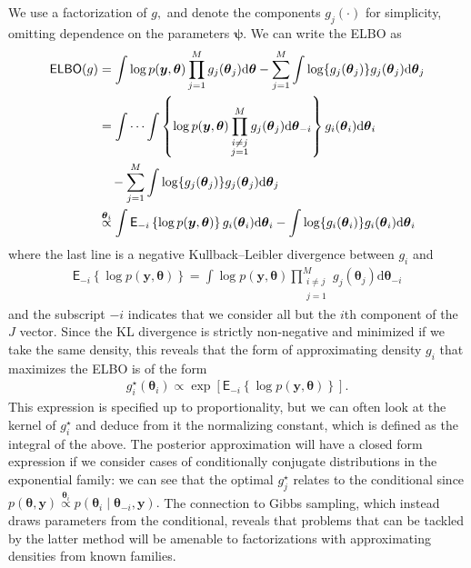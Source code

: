 \documentclass[
  11pt,
  letterpaper,
]{scrbook}
\theoremstyle{plain}
\theoremstyle{definition}
\theoremstyle{definition}
\theoremstyle{plain}
\theoremstyle{plain}
\theoremstyle{definition}
\theoremstyle{remark}
\begin{document}
We use a factorization of \(g,\) and denote the components
\(g_j(\cdot)\) for simplicity, omitting dependence on the parameters
\(\boldsymbol{\psi}.\) We can write the ELBO as \begin{align*}
\mathsf{ELBO}(g) &= \int \log p(\boldsymbol{y}, \boldsymbol{\theta}) \prod_{j=1}^M g_j(\boldsymbol{\theta}_j)\mathrm{d} \boldsymbol{\theta} - \sum_{j=1}^M \int \log \{ g_j(\boldsymbol{\theta}_j) \} g_j(\boldsymbol{\theta}_j) \mathrm{d}  \boldsymbol{\theta}_j
 \\& = \idotsint \left\{\log p(\boldsymbol{y}, \boldsymbol{\theta}) \prod_{\substack{i \neq j \\j=1}}^M g_j(\boldsymbol{\theta}_j)\mathrm{d} \boldsymbol{\theta}_{-i}\right\}  g_i(\boldsymbol{\theta}_i) \mathrm{d} \boldsymbol{\theta}_i \\& \quad - \sum_{j=1}^M \int \log \{ g_j(\boldsymbol{\theta}_j) \} g_j(\boldsymbol{\theta}_j) \mathrm{d}  \boldsymbol{\theta}_j
 \\& \stackrel{\boldsymbol{\theta}_i}{\propto} \int \mathsf{E}_{-i}\left\{\log p(\boldsymbol{y}, \boldsymbol{\theta})\right\} g_i(\boldsymbol{\theta}_i) \mathrm{d} \boldsymbol{\theta}_i - \int \log \{ g_i(\boldsymbol{\theta}_i) \} g_i(\boldsymbol{\theta}_i) \mathrm{d} \boldsymbol{\theta}_i
\end{align*} where the last line is a negative Kullback--Leibler
divergence between \(g_i\) and \begin{align*}
 \mathsf{E}_{-i}\left\{\log p(\boldsymbol{y}, \boldsymbol{\theta})\right\} = \int \log p(\boldsymbol{y}, \boldsymbol{\theta}) \prod_{\substack{i \neq j \\j=1}}^M g_j(\boldsymbol{\theta}_j)\mathrm{d} \boldsymbol{\theta}_{-i}
\end{align*} and the subscript \(-i\) indicates that we consider all but
the \(i\)th component of the \(J\) vector. Since the KL divergence is
strictly non-negative and minimized if we take the same density, this
reveals that the form of approximating density \(g_i\) that maximizes
the ELBO is of the form \begin{align*}
 g^{\star}_i(\boldsymbol{\theta}_i) \propto \exp \left[ \mathsf{E}_{-i}\left\{\log p(\boldsymbol{y}, \boldsymbol{\theta})\right\}\right].
\end{align*} This expression is specified up to proportionality, but we
can often look at the kernel of \(g^{\star}_i\) and deduce from it the
normalizing constant, which is defined as the integral of the above. The
posterior approximation will have a closed form expression if we
consider cases of conditionally conjugate distributions in the
exponential family: we can see that the optimal \(g^{\star}_j\) relates
to the conditional since
\(p(\boldsymbol{\theta}, \boldsymbol{y}) \stackrel{\boldsymbol{\theta}_i}{\propto} p(\boldsymbol{\theta}_i \mid \boldsymbol{\theta}_{-i}, \boldsymbol{y}).\)
The connection to Gibbs sampling, which instead draws parameters from
the conditional, reveals that problems that can be tackled by the latter
method will be amenable to factorizations with approximating densities
from known families.
\end{document}
